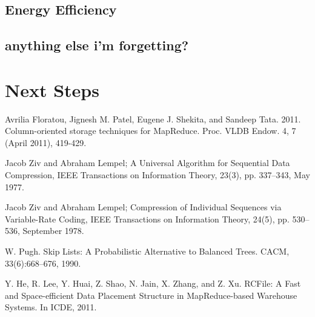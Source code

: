 \documentclass[twocolumn]{article}
\begin{document}
\subsection{Energy Efficiency}
\subsection{anything else i'm forgetting?}

\section{Next Steps}

\begin{thebibliography}{10}

 Avrilia Floratou, Jignesh M. Patel, Eugene J. Shekita, and Sandeep
	Tata. 2011. Column-oriented storage techniques for MapReduce.
	Proc. VLDB Endow. 4, 7 (April 2011), 419-429.

 Jacob Ziv and Abraham Lempel; A Universal Algorithm for Sequential
        Data Compression, IEEE Transactions on Information Theory,
        23(3), pp. 337–343, May 1977.

 Jacob Ziv and Abraham Lempel; Compression of Individual Sequences
        via Variable-Rate Coding, IEEE Transactions on Information
        Theory, 24(5), pp. 530–536, September 1978.

 W. Pugh. Skip Lists: A Probabilistic Alternative to
        Balanced Trees. CACM, 33(6):668–676, 1990.

 Y. He, R. Lee, Y. Huai, Z. Shao, N. Jain, X. Zhang, and
        Z. Xu. RCFile: A Fast and Space-efficient Data Placement
        Structure in MapReduce-based Warehouse Systems. In ICDE, 2011.

\end{thebibliography}
\end{document}
